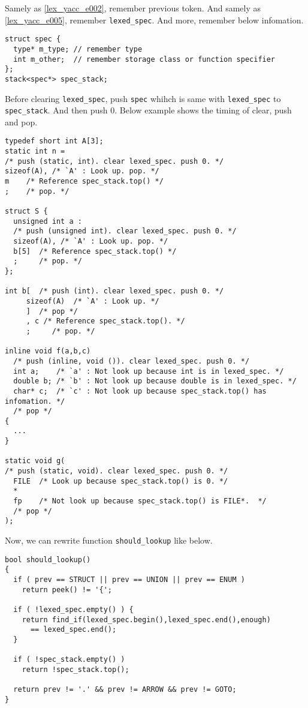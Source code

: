 \begin{Method}
\label{lex_yacc_e006}
Samely as \ref{lex_yacc_e002}, remember previous token.
And samely as \ref{lex_yacc_e005}, remember {\tt{lexed\_spec}}.
And more, remember below infomation.
\begin{verbatim}
struct spec {
  type* m_type; // remember type
  int m_other;  // remember storage class or function specifier
};
stack<spec*> spec_stack;
\end{verbatim}
Before clearing {\tt{lexed\_spec}}, 
push {\tt{spec}} whihch is same with {\tt{lexed\_spec}}
to {\tt{spec\_stack}}.
And then push 0.
Below example shows the timing of clear, push and pop.

\begin{verbatim}
typedef short int A[3];
static int n =
/* push (static, int). clear lexed_spec. push 0. */
sizeof(A), /* `A' : Look up. pop. */
m    /* Reference spec_stack.top() */
;    /* pop. */

struct S {
  unsigned int a :
  /* push (unsigned int). clear lexed_spec. push 0. */
  sizeof(A), /* `A' : Look up. pop. */
  b[5]  /* Reference spec_stack.top() */
  ;     /* pop. */
};

int b[  /* push (int). clear lexed_spec. push 0. */
     sizeof(A)  /* `A' : Look up. */
     ]  /* pop */
     , c /* Reference spec_stack.top(). */
     ;     /* pop. */

inline void f(a,b,c)
  /* push (inline, void ()). clear lexed_spec. push 0. */
  int a;    /* `a' : Not look up because int is in lexed_spec. */
  double b; /* `b' : Not look up because double is in lexed_spec. */
  char* c;  /* `c' : Not look up because spec_stack.top() has infomation. */
  /* pop */
{
  ...
}

static void g(
/* push (static, void). clear lexed_spec. push 0. */
  FILE  /* Look up because spec_stack.top() is 0. */
  *
  fp    /* Not look up because spec_stack.top() is FILE*.  */
  /* pop */
);
\end{verbatim}

Now, we can rewrite function {\tt{should\_lookup}} like below.
\begin{verbatim}
bool should_lookup()
{
  if ( prev == STRUCT || prev == UNION || prev == ENUM )
    return peek() != '{';

  if ( !lexed_spec.empty() ) {
    return find_if(lexed_spec.begin(),lexed_spec.end(),enough)
      == lexed_spec.end();
  }

  if ( !spec_stack.empty() )
    return !spec_stack.top();

  return prev != '.' && prev != ARROW && prev != GOTO;
}
\end{verbatim}
\end{Method}

